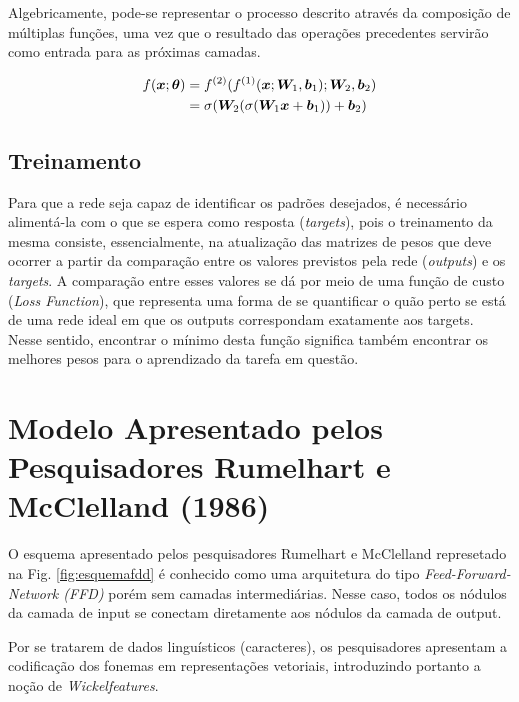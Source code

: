 Algebricamente, pode-se representar o processo descrito através da composição de múltiplas funções, uma vez que o resultado das operações precedentes servirão como entrada para as próximas camadas.

\begin{align}
f(\bm{x}; \bm{\theta}) &= f^{(2)}(f^{(1)}(\bm{x}; \bm{W}_1, \bm{b}_1); \bm{W}_2, \bm{b}_2)\\
&= \sigma(\bm{W}_2 (\sigma(\bm{W}_1\bm{x} + \bm{b}_1)) + \bm{b}_2)
\end{align}

\subsection{Treinamento}

Para que a rede seja capaz de identificar os padrões desejados, é necessário alimentá-la com o que se espera como resposta (\textit{targets}), pois o treinamento da mesma consiste, essencialmente, na atualização das matrizes de pesos que deve ocorrer a partir da comparação entre os valores previstos pela rede (\textit{outputs}) e os \textit{targets}. A comparação entre esses valores se dá por meio de uma função de custo (\textit{Loss Function}), que representa uma forma de se quantificar o quão perto se está de uma rede ideal em que os outputs correspondam exatamente aos targets. Nesse sentido, encontrar o mínimo desta função significa também encontrar os melhores pesos para o aprendizado da tarefa em questão.

\section{Modelo Apresentado pelos Pesquisadores Rumelhart e McClelland (1986)}
\label{sec:arqFDD}

O esquema apresentado pelos pesquisadores Rumelhart e McClelland represetado na Fig. \ref{fig:esquemafdd} é conhecido como uma arquitetura do tipo \textit{Feed-Forward-Network (FFD)} porém sem camadas intermediárias. Nesse caso, todos os nódulos da camada de input se conectam diretamente aos nódulos da camada de output.

Por se tratarem de dados linguísticos (caracteres), os pesquisadores apresentam a codificação dos fonemas em representações vetoriais, introduzindo portanto a noção de \textit{Wickelfeatures}.

